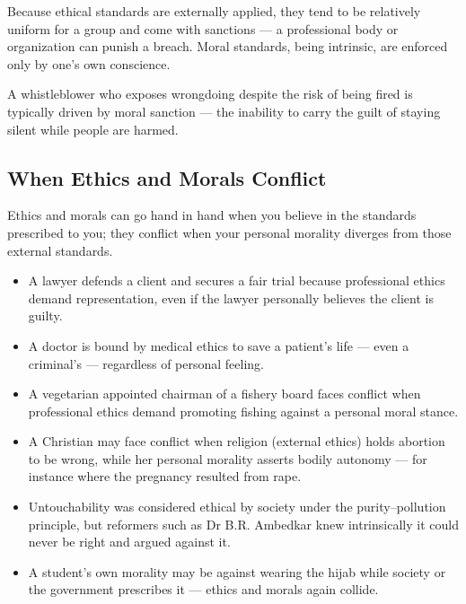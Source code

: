 \begin{CriticalPoint}
Because ethical standards are externally applied, they tend to be relatively uniform for a group and come with sanctions --- a professional body or organization can punish a breach. Moral standards, being intrinsic, are enforced only by one's own conscience.

A whistleblower who exposes wrongdoing despite the risk of being fired is typically driven by moral sanction --- the inability to carry the guilt of staying silent while people are harmed.
\end{CriticalPoint}

\subsection{When Ethics and Morals Conflict}

Ethics and morals can go hand in hand when you believe in the standards prescribed to you; they conflict when your personal morality diverges from those external standards.

\begin{ExampleBox}
\begin{itemize}
\item A lawyer defends a client and secures a fair trial because professional ethics demand representation, even if the lawyer personally believes the client is guilty.
\item A doctor is bound by medical ethics to save a patient's life --- even a criminal's --- regardless of personal feeling.
\item A vegetarian appointed chairman of a fishery board faces conflict when professional ethics demand promoting fishing against a personal moral stance.
\item A Christian may face conflict when religion (external ethics) holds abortion to be wrong, while her personal morality asserts bodily autonomy --- for instance where the pregnancy resulted from rape.
\item Untouchability was considered ethical by society under the purity--pollution principle, but reformers such as Dr B.R. Ambedkar knew intrinsically it could never be right and argued against it.
\item A student's own morality may be against wearing the hijab while society or the government prescribes it --- ethics and morals again collide.
\end{itemize}
\end{ExampleBox}

